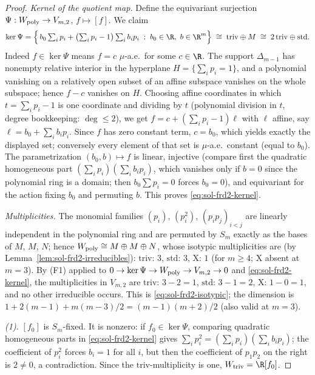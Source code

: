 \documentclass[../main.tex]{subfiles}
\begin{document}
\begin{proof}
\emph{Kernel of the quotient map.}
Define the equivariant surjection $\Psi:W_{\rm poly}\to V_{m,2}$, $f\mapsto[f]$.  We
claim
\begin{equation}
  \ker\Psi
  =\Bigl\{\,b_0\textstyle\sum_ip_i
    +\bigl(\textstyle\sum_ip_i-1\bigr)\textstyle\sum_ib_ip_i
    \;:\;b_0\in\R,\ b\in\R^m\Bigr\}
  \;\cong\;\mathrm{triv}\oplus M
  \;\cong\;2\,\mathrm{triv}\oplus\mathrm{std}.
  \label{eq:sol-frd2-kernel}
\end{equation}
Indeed $f\in\ker\Psi$ means $f=c$ $\mu$-a.e.\ for some $c\in\R$.  The support
$\Delta_{m-1}$ has nonempty relative interior in the hyperplane
$H=\{\sum_ip_i=1\}$, and a polynomial vanishing on a relatively open subset of an
affine subspace vanishes on the whole subspace; hence $f-c$ vanishes on $H$.
Choosing affine coordinates in which $t=\sum_ip_i-1$ is one coordinate and dividing
by $t$ (polynomial division in $t$, degree bookkeeping: $\deg\le2$), we get
$f=c+(\sum_ip_i-1)\ell$ with $\ell$ affine, say $\ell=b_0+\sum_ib_ip_i$.  Since $f$
has zero constant term, $c=b_0$, which yields exactly the displayed set; conversely
every element of that set is $\mu$-a.e.\ constant (equal to $b_0$).  The
parametrization $(b_0,b)\mapsto f$ is linear, injective (compare first the quadratic
homogeneous part $(\sum_ip_i)(\sum_ib_ip_i)$, which vanishes only if $b=0$ since the
polynomial ring is a domain; then $b_0\sum p_i=0$ forces $b_0=0$), and equivariant
for the action fixing $b_0$ and permuting $b$.  This proves
\eqref{eq:sol-frd2-kernel}.

\emph{Multiplicities.}
The monomial families $(p_i)$, $(p_i^2)$, $(p_ip_j)_{i<j}$ are linearly independent
in the polynomial ring and are permuted by $S_m$ exactly as the bases of $M$, $M$,
$N$; hence $W_{\rm poly}\cong M\oplus M\oplus N$, whose isotypic multiplicities are
(by Lemma~\ref{lem:sol-frd2-irreducibles}): $\mathrm{triv}$: $3$, $\mathrm{std}$:
$3$, $\mathrm X$: $1$ (for $m\ge4$; $\mathrm X$ absent at $m=3$).  By (F1) applied to
$0\to\ker\Psi\to W_{\rm poly}\to V_{m,2}\to0$ and \eqref{eq:sol-frd2-kernel}, the
multiplicities in $V_{m,2}$ are $\mathrm{triv}$: $3-2=1$, $\mathrm{std}$: $3-1=2$,
$\mathrm X$: $1-0=1$, and no other irreducible occurs.  This is
\eqref{eq:sol-frd2-isotypic}; the dimension is
$1+2(m-1)+m(m-3)/2=(m-1)(m+2)/2$ (also valid at $m=3$).

\emph{(1).}
$[f_0]$ is $S_m$-fixed.  It is nonzero: if $f_0\in\ker\Psi$, comparing quadratic
homogeneous parts in \eqref{eq:sol-frd2-kernel} gives
$\sum_ip_i^2=(\sum_ip_i)(\sum_ib_ip_i)$; the coefficient of $p_i^2$ forces $b_i=1$
for all $i$, but then the coefficient of $p_1p_2$ on the right is $2\ne0$, a
contradiction.  Since the $\mathrm{triv}$-multiplicity is one,
$W_{\rm triv}=\R[f_0]$.


\end{proof}
\end{document}
